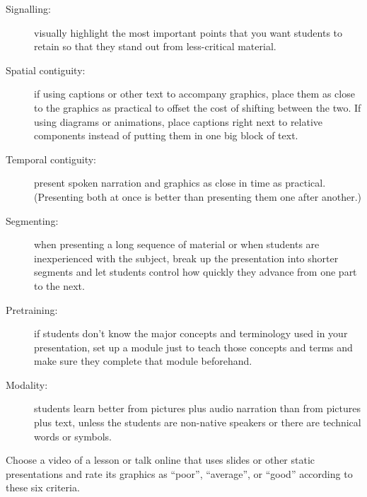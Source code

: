 \begin{description}

\item[Signalling:]
  visually highlight the most important points that you want students to retain
  so that they stand out from less-critical material.

\item[Spatial contiguity:]
  if using captions or other text to accompany graphics,
  place them as close to the graphics as practical to offset the cost of shifting between the two.
  If using diagrams or animations,
  place captions right next to relative components instead of putting them in one big block of text.

\item[Temporal contiguity:]
  present spoken narration and graphics as close in time as practical.
  (Presenting both at once is better than presenting them one after another.)

\item[Segmenting:]
  when presenting a long sequence of material or when students are inexperienced with the subject,
  break up the presentation into shorter segments
  and let students control how quickly they advance from one part to the next.

\item[Pretraining:]
  if students don't know the major concepts and terminology used in your presentation,
  set up a module just to teach those concepts and terms and make sure they complete that module beforehand.

\item[Modality:]
  students learn better from pictures plus audio narration than from pictures plus text,
  unless the students are non-native speakers
  or there are technical words or symbols.

\end{description}

Choose a video of a lesson or talk online that uses slides or other static presentations
and rate its graphics as ``poor'', ``average'', or ``good'' according to these six criteria.
